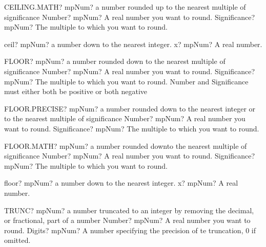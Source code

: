 \documentclass[12pt,a4paper,openany]{book}
\begin{document}
\begin{mpFunctionsExtract}
\mpWorksheetFunctionTwoNotImplemented
{CEILING.MATH? mpNum? a number rounded up to the nearest multiple of significance}
{Number? mpNum? A real number you want to round.}
{Significance? mpNum? The multiple to which you want to round.}
\end{mpFunctionsExtract}

\begin{mpFunctionsExtract}
\mpFunctionOne
{ceil? mpNum?  a number down to the nearest integer.}
{x? mpNum? A real number.}
\end{mpFunctionsExtract}

\begin{mpFunctionsExtract}
\mpWorksheetFunctionTwoNotImplemented
{FLOOR? mpNum? a number rounded down to the nearest multiple of significance}
{Number? mpNum? A real number you want to round.}
{Significance? mpNum? The multiple to which you want to round. Number and Significance must either both be positive or both negative}
\end{mpFunctionsExtract}

\begin{mpFunctionsExtract}
\mpWorksheetFunctionTwoNotImplemented
{FLOOR.PRECISE? mpNum? a number rounded down to the nearest integer or to the nearest multiple of significance}
{Number? mpNum? A real number you want to round.}
{Significance? mpNum? The multiple to which you want to round.}
\end{mpFunctionsExtract}

\begin{mpFunctionsExtract}
\mpWorksheetFunctionTwoNotImplemented
{FLOOR.MATH? mpNum? a number rounded downto the nearest multiple of significance}
{Number? mpNum? A real number you want to round.}
{Significance? mpNum? The multiple to which you want to round.}
\end{mpFunctionsExtract}

\begin{mpFunctionsExtract}
\mpFunctionOne
{floor? mpNum?  a number down to the nearest integer.}
{x? mpNum? A real number.}
\end{mpFunctionsExtract}

\begin{mpFunctionsExtract}
\mpWorksheetFunctionTwoNotImplemented
{TRUNC? mpNum? a number truncated to an integer by removing the decimal, or fractional, part of a number}
{Number? mpNum? A real number you want to round.}
{Digits? mpNum? A number specifying the precision of te truncation, 0 if omitted.}
\end{mpFunctionsExtract}
\end{document}
